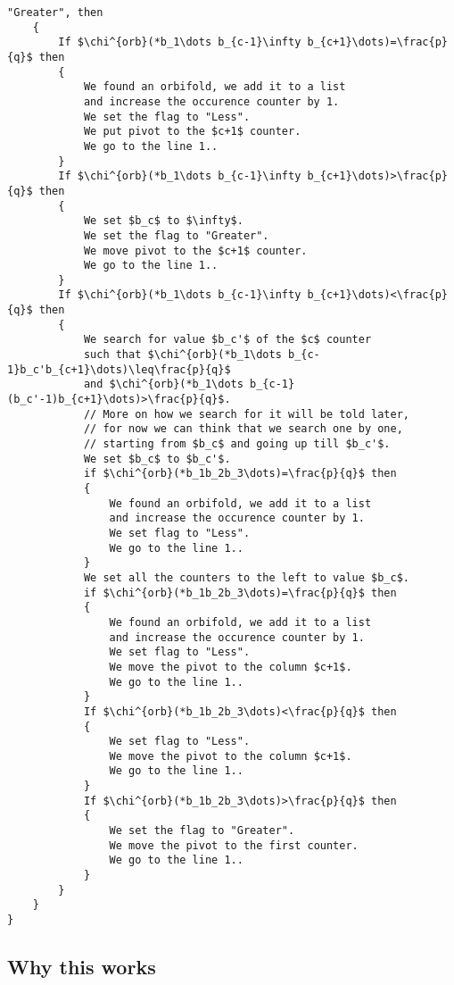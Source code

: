 \begin{lstlisting}[firstnumber=1,consecutivenumbers=true]
    "Greater", then
    {
        If $\chi^{orb}(*b_1\dots b_{c-1}\infty b_{c+1}\dots)=\frac{p}{q}$ then
        {
            We found an orbifold, we add it to a list 
            and increase the occurence counter by 1. 
            We set the flag to "Less".
            We put pivot to the $c+1$ counter.
            We go to the line 1..
        } 
        If $\chi^{orb}(*b_1\dots b_{c-1}\infty b_{c+1}\dots)>\frac{p}{q}$ then
        {
            We set $b_c$ to $\infty$.
            We set the flag to "Greater".
            We move pivot to the $c+1$ counter.
            We go to the line 1..
        }  
        If $\chi^{orb}(*b_1\dots b_{c-1}\infty b_{c+1}\dots)<\frac{p}{q}$ then
        {
            We search for value $b_c'$ of the $c$ counter 
            such that $\chi^{orb}(*b_1\dots b_{c-1}b_c'b_{c+1}\dots)\leq\frac{p}{q}$ 
            and $\chi^{orb}(*b_1\dots b_{c-1}(b_c'-1)b_{c+1}\dots)>\frac{p}{q}$.
            // More on how we search for it will be told later, 
            // for now we can think that we search one by one,
            // starting from $b_c$ and going up till $b_c'$.
            We set $b_c$ to $b_c'$.
            if $\chi^{orb}(*b_1b_2b_3\dots)=\frac{p}{q}$ then 
            {
                We found an orbifold, we add it to a list 
                and increase the occurence counter by 1. 
                We set flag to "Less".
                We go to the line 1..
            }
            We set all the counters to the left to value $b_c$.
            if $\chi^{orb}(*b_1b_2b_3\dots)=\frac{p}{q}$ then 
            {
                We found an orbifold, we add it to a list 
                and increase the occurence counter by 1. 
                We set flag to "Less".
                We move the pivot to the column $c+1$.
                We go to the line 1..
            }
            If $\chi^{orb}(*b_1b_2b_3\dots)<\frac{p}{q}$ then 
            {
                We set flag to "Less".
                We move the pivot to the column $c+1$.
                We go to the line 1..
            }
            If $\chi^{orb}(*b_1b_2b_3\dots)>\frac{p}{q}$ then 
            {
                We set the flag to "Greater".
                We move the pivot to the first counter.
                We go to the line 1..
            }
        }  
    }
}
\end{lstlisting}

\subsection{Why this works}

